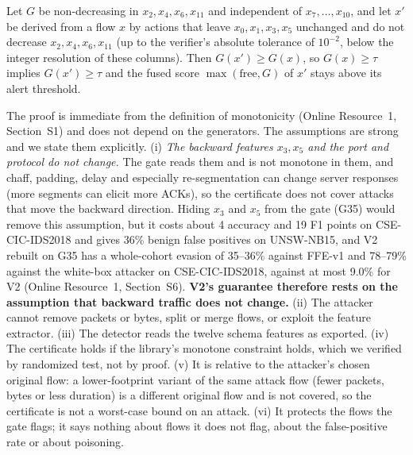 \begin{proposition}
\label{prop:certificate}
Let $G$ be non-decreasing in $x_2,x_4,x_6,x_{11}$ and independent of $x_7,\dots,x_{10}$, and let $x'$ be derived from a flow $x$ by actions that leave $x_0,x_1,x_3,x_5$ unchanged and do not decrease $x_2,x_4,x_6,x_{11}$ (up to the verifier's absolute tolerance of $10^{-2}$, below the integer resolution of these columns). Then $G(x')\ge G(x)$, so $G(x)\ge\tau$ implies $G(x')\ge\tau$ and the fused score $\max(\text{free},G)$ of $x'$ stays above its alert threshold.
\end{proposition}
The proof is immediate from the definition of monotonicity (Online Resource~1, Section~S1) and does not depend on the generators. The assumptions are strong and we state them explicitly. (i) \emph{The backward features $x_3,x_5$ and the port and protocol do not change.} The gate reads them and is not monotone in them, and chaff, padding, delay and especially re-segmentation can change server responses (more segments can elicit more ACKs), so the certificate does not cover attacks that move the backward direction. Hiding $x_3$ and $x_5$ from the gate (G35) would remove this assumption, but it costs about 4 accuracy and 19 F1 points on CSE-CIC-IDS2018 and gives 36\% benign false positives on UNSW-NB15, and V2 rebuilt on G35 has a whole-cohort evasion of 35--36\% against FFE-v1 and 78--79\% against the white-box attacker on CSE-CIC-IDS2018, against at most 9.0\% for V2 (Online Resource~1, Section~S6). \textbf{V2's guarantee therefore rests on the assumption that backward traffic does not change.} (ii) The attacker cannot remove packets or bytes, split or merge flows, or exploit the feature extractor. (iii) The detector reads the twelve schema features as exported. (iv) The certificate holds if the library's monotone constraint holds, which we verified by randomized test, not by proof. (v) It is relative to the attacker's chosen original flow: a lower-footprint variant of the same attack flow (fewer packets, bytes or less duration) is a different original flow and is not covered, so the certificate is not a worst-case bound on an attack. (vi) It protects the flows the gate flags; it says nothing about flows it does not flag, about the false-positive rate or about poisoning.

